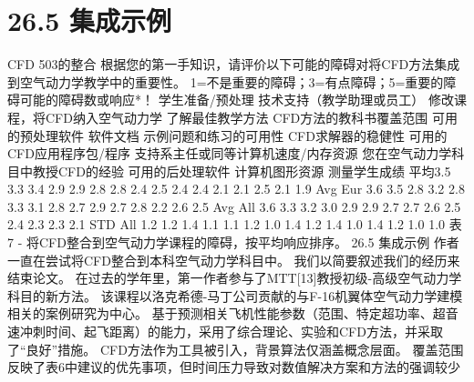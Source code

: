 \documentclass[UTF8,11pt,a4paper,openany,fontset=fandol]{ctexbook}
\begin{document}
\section{26.5 集成示例}
CFD 503的整合 根据您的第一手知识，请评价以下可能的障碍对将CFD方法集成到空气动力学教学中的重要性。 1=不是重要的障碍；3=有点障碍；5=重要的障碍可能的障碍数或响应*！ 学生准备/预处理 技术支持（教学助理或员工） 修改课程，将CFD纳入空气动力学 了解最佳教学方法 CFD方法的教科书覆盖范围 可用的预处理软件 软件文档 示例问题和练习的可用性 CFD求解器的稳健性 可用的CFD应用程序包/程序 支持系主任或同等计算机速度/内存资源 您在空气动力学科目中教授CFD的经验 可用的后处理软件 计算机图形资源 测量学生成绩 平均3.5 3.3 3.4 2.9 2.9 2.8 2.8 2.4 2.5 2.4 2.4 2.1 2.1 2.5 2.1 1.9 Avg Eur 3.6 3.5 2.8 3.2 2.8 3.3 3.1 2.8 2.7 2.9 2.7 2.8 2.2 2.6 2.5 Avg All 3.6 3.3 3.2 3.0 2.9 2.9 2.7 2.7 2.6 2.5 2.4 2.3 2.3 2.1 STD All 1.2 1.2 1.4 1.1 1.1 1.2 1.0 1.4 1.2 1.4 1.0 1.4 1.2 1.0 1.0 表7 - 将CFD整合到空气动力学课程的障碍，按平均响应排序。 26.5 集成示例 作者一直在尝试将CFD整合到本科空气动力学科目中。 我们以简要叙述我们的经历来结束论文。 在过去的学年里，第一作者参与了MTT[13]教授初级-高级空气动力学科目的新方法。 该课程以洛克希德-马丁公司贡献的与F-16机翼体空气动力学建模相关的案例研究为中心。 基于预测相关飞机性能参数（范围、特定超功率、超音速冲刺时间、起飞距离）的能力，采用了综合理论、实验和CFD方法，并采取了“良好”措施。 CFD方法作为工具被引入，背景算法仅涵盖概念层面。 覆盖范围反映了表6中建议的优先事项，但时间压力导致对数值解决方案和方法的强调较少
\end{document}
